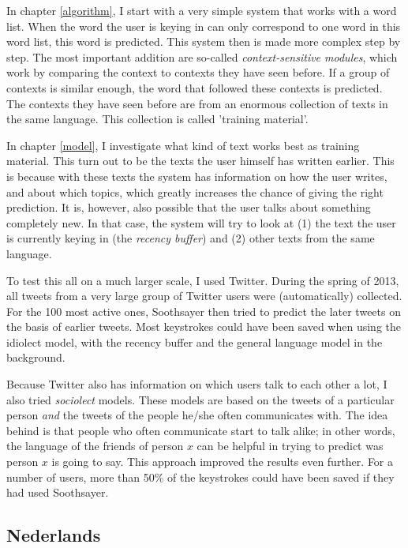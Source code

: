 \documentclass[12pt]{article}
\begin{document}
In chapter \ref{algorithm}, I start with a very simple system that works with a word list. When the word the user is keying in can only correspond to one word in this word list, this word is predicted. This system then is made more complex step by step. The most important addition are so-called \emph{context-sensitive modules}, which work by comparing the context to contexts they have seen before. If a group of contexts is similar enough, the word that followed these contexts is predicted. The contexts they have seen before are from an enormous collection of texts in the same language. This collection is called 'training material'.

In chapter \ref{model}, I investigate what kind of text works best as training material. This turn out to be the texts the user himself has written earlier. This is because with these texts the system has information on how the user writes, and about which topics, which greatly increases the chance of giving the right prediction. It is, however, also possible that the user talks about something completely new. In that case, the system will try to look at (1) the text the user is currently keying in (the \emph{recency buffer}) and (2) other texts from the same language.

To test this all on a much larger scale, I used Twitter. During the spring of 2013, all tweets from a very large group of Twitter users were (automatically) collected. For the 100 most active ones, Soothsayer then tried to predict the later tweets on the basis of earlier tweets. Most keystrokes could have been saved when using the idiolect model, with the recency buffer and the general language model in the background. 

Because Twitter also has information on which users talk to each other a lot, I also tried \emph{sociolect} models. These models are based on the tweets of a particular person \emph{and} the tweets of the people he/she often communicates with. The idea behind is that people who often communicate start to talk alike; in other words, the language of the friends of person $x$ can be helpful in trying to predict was person $x$ is going to say. This approach improved the results even further. For a number of users, more than 50\% of the keystrokes could have been saved if they had used Soothsayer. 

\subsection{Nederlands}
\end{document}
